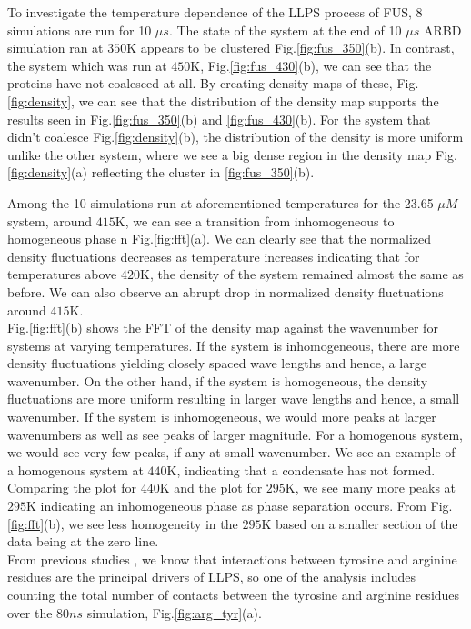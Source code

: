 \documentclass[12ptr]{article}
\begin{document}
To investigate the temperature dependence of the LLPS process of FUS, 8 simulations are run for 10 $\mu s$. The state of the system at the end of 10 $\mu s$ ARBD simulation ran at $350$K appears to be clustered Fig.\ref{fig:fus_350}(b). In contrast, the system which was run at $450$K, Fig.\ref{fig:fus_430}(b), we can see that the proteins have not coalesced at all. By creating density maps of these, Fig.\ref{fig:density}, we can see that the distribution of the density map supports the results seen in Fig.\ref{fig:fus_350}(b) and \ref{fig:fus_430}(b). For the system that didn't coalesce Fig.\ref{fig:density}(b), the distribution of the density is more uniform unlike the other system, where we see a big dense region in the density map Fig.\ref{fig:density}(a) reflecting the cluster in \ref{fig:fus_350}(b).

Among the 10 simulations run at aforementioned temperatures for the 23.65 $\mu M$ system, around $415$K, we can see a transition from inhomogeneous to homogeneous phase n Fig.\ref{fig:fft}(a). We can clearly see that the normalized density fluctuations decreases as temperature increases indicating that for temperatures above $420$K, the density of the system remained almost the same as before. We can also observe an abrupt drop in normalized density fluctuations around $415$K. \\[0.01cm]

Fig.\ref{fig:fft}(b) shows the FFT of the density map against the wavenumber for systems at varying temperatures. If the system is inhomogeneous, there are more density fluctuations yielding closely spaced wave lengths and hence, a large wavenumber. On the other hand, if the system is homogeneous, the density fluctuations are more uniform resulting in larger wave lengths and hence, a small wavenumber. If the system is inhomogeneous, we would more peaks at larger wavenumbers as well as see peaks of larger magnitude. For a homogenous system, we would see very few peaks, if any at small wavenumber. We see an example of a homogenous system at $440$K, indicating that a condensate has not formed. Comparing the plot for $440$K and the plot for $295$K, we see many more peaks at $295$K indicating an inhomogeneous phase as phase separation occurs.  From Fig.\ref{fig:fft}(b), we see less homogeneity in the $295$K based on a smaller section of the data being at the zero line. \\[0.01cm]

From previous studies \cite{Wang_18}, we know that interactions between tyrosine and arginine residues are the principal drivers of LLPS, so one of the analysis includes counting the total number of contacts between the tyrosine and arginine residues over the $80 ns$ simulation, Fig.\ref{fig:arg_tyr}(a). \\[0.01cm]
\end{document}
